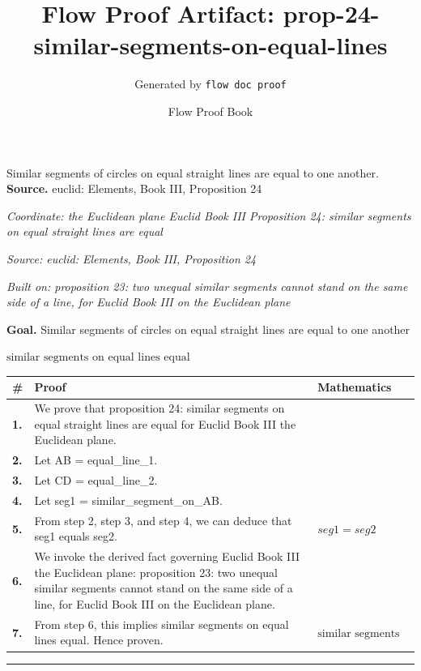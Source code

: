 \documentclass[11pt]{article}
\title{Flow Proof Artifact: prop-24-similar-segments-on-equal-lines}
\author{Generated by \texttt{flow doc proof}}
\date{Flow Proof Book}
\theoremstyle{definition}
\begin{document}
\maketitle
Similar segments of circles on equal straight lines are equal to one another.\\[0.5em]
\textbf{Source.} euclid: Elements, Book III, Proposition 24\\[0.5em]
\bigskip
{}\par
\smallskip\noindent\textit{Coordinate: the Euclidean plane \cdot Euclid Book III \cdot Proposition 24: similar segments on equal straight lines are equal}\par
\smallskip\noindent\textit{Source: euclid: Elements, Book III, Proposition 24}\par
\smallskip\noindent\textit{Built on: proposition 23: two unequal similar segments cannot stand on the same side of a line, for Euclid Book III on the Euclidean plane}\par
\medskip
\noindent\textbf{Goal.} Similar segments of circles on equal straight lines are equal to one another\par
\noindent$\displaystyle \text{similar segments on equal lines equal}$\par
\medskip
\noindent
\begin{tabular}{@{} >{\raggedright\arraybackslash}p{} >{\raggedright\arraybackslash}p{} >{\raggedleft\arraybackslash}p{} @{}}
\textbf{\#} & \textbf{Proof} & \textbf{Mathematics} \\
\midrule
\textbf{1.} & We prove that proposition 24: similar segments on equal straight lines are equal for Euclid Book III the Euclidean plane. & \\[0.45em]
\textbf{2.} & Let AB = equal\_line\_1. & \\[0.45em]
\textbf{3.} & Let CD = equal\_line\_2. & \\[0.45em]
\textbf{4.} & Let seg1 = similar\_segment\_on\_AB. & \\[0.45em]
\textbf{5.} & From step 2, step 3, and step 4, we can deduce that seg1 equals seg2. & $\displaystyle seg1 = seg2$ \\[0.45em]
\textbf{6.} & We invoke the derived fact governing Euclid Book III the Euclidean plane: proposition 23: two unequal similar segments cannot stand on the same side of a line, for Euclid Book III on the Euclidean plane. & \\[0.45em]
\textbf{7.} & From step 6, this implies similar segments on equal lines equal. Hence proven. & $\displaystyle \text{similar segments on equal lines equal}$ \\[0.45em]
\bottomrule
\end{tabular}
\label{thm:Geometry-Euclid Book III-proposition_24_similar_segments_on_equal_straight_lines_are_equal}
\par\medskip\hrule
\end{document}
